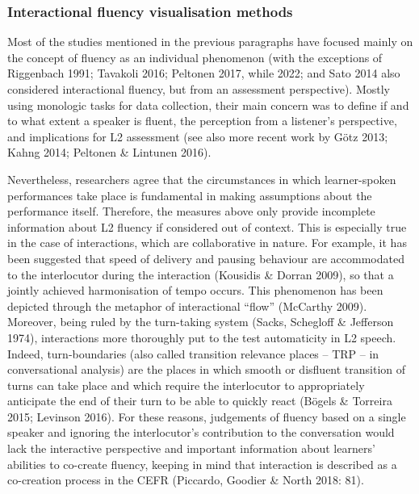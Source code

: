 \subsubsection{Interactional fluency visualisation methods}
\hypertarget{Toc191305928}{}\begin{styleStandard}
Most of the studies mentioned in the previous paragraphs have focused mainly on the concept of fluency as an individual phenomenon (with the exceptions of Riggenbach 1991; Tavakoli 2016; Peltonen 2017, while 2022; and Sato 2014 also considered interactional fluency, but from an assessment perspective). Mostly using monologic tasks for data collection, their main concern was to define if and to what extent a speaker is fluent, the perception from a listener’s perspective, and implications for L2 assessment (see also more recent work by Götz 2013; Kahng 2014; Peltonen \& Lintunen 2016).
\end{styleStandard}

\begin{styleStandard}
Nevertheless, researchers agree that the circumstances in which learner-spoken performances take place is fundamental in making assumptions about the performance itself. Therefore, the measures above only provide incomplete information about L2 fluency if considered out of context. This is especially true in the case of interactions, which are collaborative in nature. For example, it has been suggested that speed of delivery and pausing behaviour are accommodated to the interlocutor during the interaction (Kousidis \& Dorran 2009), so that a jointly achieved harmonisation of tempo occurs. This phenomenon has been depicted through the metaphor of interactional “flow” (McCarthy 2009). Moreover, being ruled by the turn-taking system (Sacks, Schegloff \& Jefferson 1974), interactions more thoroughly put to the test automaticity in L2 speech. Indeed, turn-boundaries (also called transition relevance places – TRP – in conversational analysis) are the places in which smooth or disfluent transition of turns can take place and which require the interlocutor to appropriately anticipate the end of their turn to be able to quickly react (Bögels \& Torreira 2015; Levinson 2016). For these reasons, judgements of fluency based on a single speaker and ignoring the interlocutor’s contribution to the conversation would lack the interactive perspective and important information about learners’ abilities to co-create fluency, keeping in mind that interaction is described as a co-creation process in the CEFR (Piccardo, Goodier \& North 2018: 81). 
\end{styleStandard}

